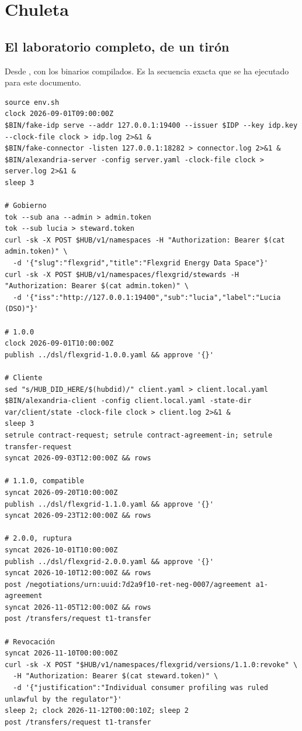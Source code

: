 \chapter{Chuleta}
\label{ch:chuleta}

\section{El laboratorio completo, de un tirón}

Desde , con los binarios compilados. Es la secuencia exacta que se ha
ejecutado para este documento.

\begin{lstlisting}[style=sh]
source env.sh
clock 2026-09-01T09:00:00Z
$BIN/fake-idp serve --addr 127.0.0.1:19400 --issuer $IDP --key idp.key --clock-file clock > idp.log 2>&1 &
$BIN/fake-connector -listen 127.0.0.1:18282 > connector.log 2>&1 &
$BIN/alexandria-server -config server.yaml -clock-file clock > server.log 2>&1 &
sleep 3

# Gobierno
tok --sub ana --admin > admin.token
tok --sub lucia > steward.token
curl -sk -X POST $HUB/v1/namespaces -H "Authorization: Bearer $(cat admin.token)" \
  -d '{"slug":"flexgrid","title":"Flexgrid Energy Data Space"}'
curl -sk -X POST $HUB/v1/namespaces/flexgrid/stewards -H "Authorization: Bearer $(cat admin.token)" \
  -d '{"iss":"http://127.0.0.1:19400","sub":"lucia","label":"Lucia (DSO)"}'

# 1.0.0
clock 2026-09-01T10:00:00Z
publish ../dsl/flexgrid-1.0.0.yaml && approve '{}'

# Cliente
sed "s/HUB_DID_HERE/$(hubdid)/" client.yaml > client.local.yaml
$BIN/alexandria-client -config client.local.yaml -state-dir var/client/state -clock-file clock > client.log 2>&1 &
sleep 3
setrule contract-request; setrule contract-agreement-in; setrule transfer-request
syncat 2026-09-03T12:00:00Z && rows

# 1.1.0, compatible
syncat 2026-09-20T10:00:00Z
publish ../dsl/flexgrid-1.1.0.yaml && approve '{}'
syncat 2026-09-23T12:00:00Z && rows

# 2.0.0, ruptura
syncat 2026-10-01T10:00:00Z
publish ../dsl/flexgrid-2.0.0.yaml && approve '{}'
syncat 2026-10-10T12:00:00Z && rows
post /negotiations/urn:uuid:7d2a9f10-ret-neg-0007/agreement a1-agreement
syncat 2026-11-05T12:00:00Z && rows
post /transfers/request t1-transfer

# Revocación
syncat 2026-11-10T00:00:00Z
curl -sk -X POST "$HUB/v1/namespaces/flexgrid/versions/1.1.0:revoke" \
  -H "Authorization: Bearer $(cat steward.token)" \
  -d '{"justification":"Individual consumer profiling was ruled unlawful by the regulator"}'
sleep 2; clock 2026-11-12T00:00:10Z; sleep 2
post /transfers/request t1-transfer
\end{lstlisting}


